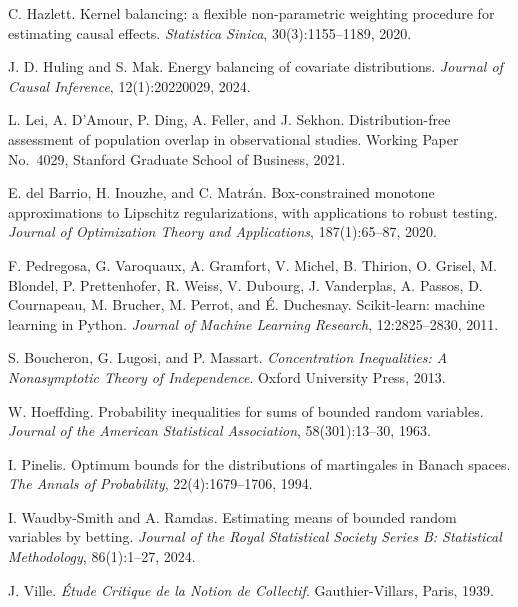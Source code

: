 C. Hazlett.
\newblock Kernel balancing: a flexible non-parametric weighting procedure for estimating causal effects.
\newblock \emph{Statistica Sinica}, 30(3):1155--1189, 2020.

J. D. Huling and S. Mak.
\newblock Energy balancing of covariate distributions.
\newblock \emph{Journal of Causal Inference}, 12(1):20220029, 2024.

L. Lei, A. D'Amour, P. Ding, A. Feller, and J. Sekhon.
\newblock Distribution-free assessment of population overlap in observational studies.
\newblock Working Paper No.~4029, Stanford Graduate School of Business, 2021.

E. del Barrio, H. Inouzhe, and C. Matr\'an.
\newblock Box-constrained monotone approximations to Lipschitz regularizations, with applications to robust testing.
\newblock \emph{Journal of Optimization Theory and Applications}, 187(1):65--87, 2020.

F. Pedregosa, G. Varoquaux, A. Gramfort, V. Michel, B. Thirion, O. Grisel, M. Blondel, P. Prettenhofer, R. Weiss, V. Dubourg, J. Vanderplas, A. Passos, D. Cournapeau, M. Brucher, M. Perrot, and {\'E}. Duchesnay.
\newblock Scikit-learn: machine learning in {P}ython.
\newblock \emph{Journal of Machine Learning Research}, 12:2825--2830, 2011.

S. Boucheron, G. Lugosi, and P. Massart.
\newblock \emph{Concentration Inequalities: A Nonasymptotic Theory of Independence}.
\newblock Oxford University Press, 2013.

W. Hoeffding.
\newblock Probability inequalities for sums of bounded random variables.
\newblock \emph{Journal of the American Statistical Association}, 58(301):13--30, 1963.

I. Pinelis.
\newblock Optimum bounds for the distributions of martingales in {B}anach spaces.
\newblock \emph{The Annals of Probability}, 22(4):1679--1706, 1994.

I. Waudby-Smith and A. Ramdas.
\newblock Estimating means of bounded random variables by betting.
\newblock \emph{Journal of the Royal Statistical Society Series B: Statistical Methodology}, 86(1):1--27, 2024.

J. Ville.
\newblock \emph{\'Etude Critique de la Notion de Collectif}.
\newblock Gauthier-Villars, Paris, 1939.

